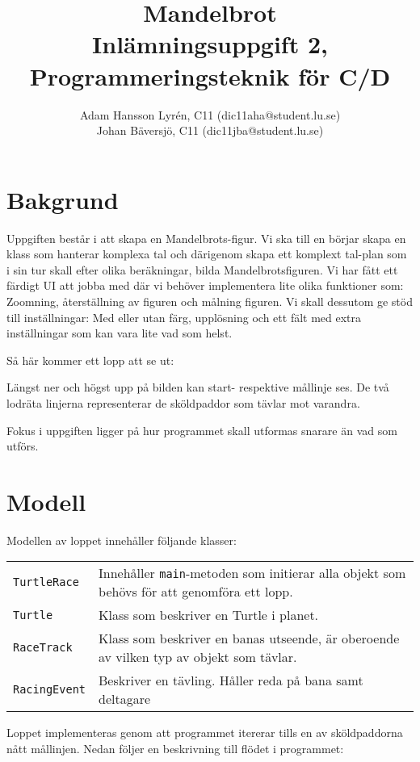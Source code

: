 \documentclass[a4paper]{article}
\title{Mandelbrot \\
	Inlämningsuppgift 2, Programmeringsteknik för C/D}
\author{Adam Hansson Lyrén, C11 (dic11aha@student.lu.se)\\
Johan Bäversjö, C11 (dic11jba@student.lu.se)}
\newcommand{\code}[1]{\texttt{#1}} %
\begin{document}

\maketitle
\thispagestyle{empty}
\newpage
\setcounter{page}{1}
\section{Bakgrund}
Uppgiften består i att skapa en Mandelbrots-figur. Vi ska till en börjar skapa en klass som hanterar komplexa tal och därigenom skapa ett komplext tal-plan som i sin tur skall efter olika beräkningar, bilda Mandelbrotsfiguren. Vi har fått ett färdigt UI att jobba med där vi behöver implementera lite olika funktioner som: Zoomning, återställning av figuren och målning figuren.
Vi skall dessutom ge stöd till inställningar: Med eller utan färg, upplösning och ett fält med extra inställningar som kan vara lite vad som helst.

Så här kommer ett lopp att se ut:
\begin{center}
\end{center}
Längst ner och högst upp på bilden kan start- respektive mållinje ses. De två lodräta linjerna representerar de sköldpaddor som tävlar mot varandra.

Fokus i uppgiften ligger på hur programmet skall utformas snarare än vad som utförs. 

\section{Modell}
Modellen av loppet innehåller följande klasser:


\begin{tabular}{lp{8cm}}
\code{TurtleRace} & Innehåller \code{main}-metoden som initierar alla objekt som behövs för att genomföra ett lopp. \\
\code{Turtle} & Klass som beskriver en Turtle i planet. \\
\code{RaceTrack} & Klass som beskriver en banas utseende, är oberoende av vilken typ av objekt som tävlar. \\
\code{RacingEvent} & Beskriver en tävling. Håller reda på bana samt deltagare \\

\end{tabular}

\vspace{\baselineskip}
Loppet implementeras genom att programmet itererar tills en av sköldpaddorna nått mållinjen.
Nedan följer en beskrivning till flödet i programmet:
\end{document}
